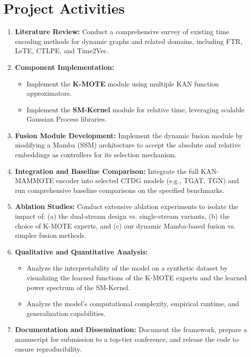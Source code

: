 \documentclass{article}
\begin{document}
\section*{Project Activities}
\begin{enumerate}
  \item \textbf{Literature Review:} Conduct a comprehensive survey of existing time encoding methods for dynamic graphs and related domains, including FTR, LeTE, CTLPE, and Time2Vec.
  \item \textbf{Component Implementation:}
    \begin{itemize}
        \item Implement the \textbf{K-MOTE} module using multiple KAN function approximators.
        \item Implement the \textbf{SM-Kernel} module for relative time, leveraging scalable Gaussian Process libraries.
    \end{itemize}
  \item \textbf{Fusion Module Development:} Implement the dynamic fusion module by modifying a Mamba (SSM) architecture to accept the absolute and relative embeddings as controllers for its selection mechanism.
  \item \textbf{Integration and Baseline Comparison:} Integrate the full KAN-MAMMOTE encoder into selected CTDG models (e.g., TGAT, TGN) and run comprehensive baseline comparisons on the specified benchmarks.
  \item \textbf{Ablation Studies:} Conduct extensive ablation experiments to isolate the impact of: (a) the dual-stream design vs. single-stream variants, (b) the choice of K-MOTE experts, and (c) our dynamic Mamba-based fusion vs. simpler fusion methods.
  \item \textbf{Qualitative and Quantitative Analysis:}
    \begin{itemize}
        \item Analyze the interpretability of the model on a synthetic dataset by visualizing the learned functions of the K-MOTE experts and the learned power spectrum of the SM-Kernel.
        \item Analyze the model's computational complexity, empirical runtime, and generalization capabilities.
    \end{itemize}
  \item \textbf{Documentation and Dissemination:} Document the framework, prepare a manuscript for submission to a top-tier conference, and release the code to ensure reproducibility.
\end{enumerate}
\end{document}
